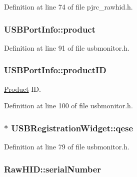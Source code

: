 Definition at line 74 of file pjrc\-\_\-rawhid.\-h.

\hypertarget{group___raw_h_i_d_plugin_ga8b2fb49e267664c4838e1205f57538d8}{
\subsubsection[{product}]{ U\-S\-B\-Port\-Info\-::product}}\label{group___raw_h_i_d_plugin_ga8b2fb49e267664c4838e1205f57538d8}


Definition at line 91 of file usbmonitor.\-h.

\hypertarget{group___raw_h_i_d_plugin_ga5bcd5b32d008f2c5cd5a6d3b7ec23b97}{
\subsubsection[{product\-I\-D}]{ U\-S\-B\-Port\-Info\-::product\-I\-D}}\label{group___raw_h_i_d_plugin_ga5bcd5b32d008f2c5cd5a6d3b7ec23b97}


\hyperlink{class_product}{Product} I\-D. 



Definition at line 100 of file usbmonitor.\-h.

\hypertarget{group___raw_h_i_d_plugin_ga0cc367841d16c562f474b130448cc184}{
\subsubsection[{qese}]{$\ast$ U\-S\-B\-Registration\-Widget\-::qese\hspace{0.3cm}{\ttfamily [protected]}}}\label{group___raw_h_i_d_plugin_ga0cc367841d16c562f474b130448cc184}


Definition at line 79 of file usbmonitor.\-h.

\hypertarget{group___raw_h_i_d_plugin_ga0b5d9bd4ac69612199afa5b59dfc3ed6}{
\subsubsection[{serial\-Number}]{ Raw\-H\-I\-D\-::serial\-Number\hspace{0.3cm}{\ttfamily [protected]}}}\label{group___raw_h_i_d_plugin_ga0b5d9bd4ac69612199afa5b59dfc3ed6}


